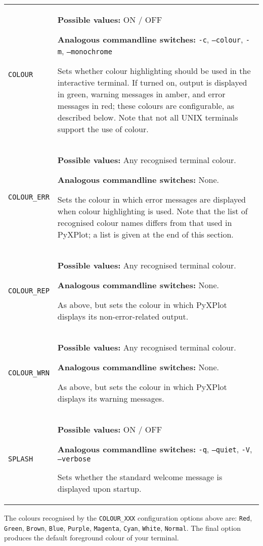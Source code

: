 \documentclass[a4paper,onecolumn,11pt]{book}
\begin{document}
\begin{longtable}{p{3.4cm}p{9cm}}
\texttt{COLOUR} & \textbf{Possible values:} ON / OFF

                  \textbf{Analogous commandline switches:} \texttt{-c}, \texttt{--colour}, \texttt{-m}, \texttt{--monochrome}

                  Sets whether colour highlighting should be used in the interactive terminal. If turned on, output is displayed in green, warning messages in amber, and error messages in red; these colours are configurable, as described below. Note that not all UNIX terminals support the use of colour.
                   \\
\texttt{COLOUR\_ERR} & \textbf{Possible values:} Any recognised terminal colour.

                  \textbf{Analogous commandline switches:} None.

                  Sets the colour in which error messages are displayed when colour highlighting is used. Note that the list of recognised colour names differs from that used in PyXPlot; a list is given at the end of this section.
                   \\
\texttt{COLOUR\_REP} & \textbf{Possible values:} Any recognised terminal colour.

                  \textbf{Analogous commandline switches:} None.

                  As above, but sets the colour in which PyXPlot displays its non-error-related output.
                   \\
\texttt{COLOUR\_WRN} & \textbf{Possible values:} Any recognised terminal colour.

                  \textbf{Analogous commandline switches:} None.

                  As above, but sets the colour in which PyXPlot displays its warning messages.
                   \\
\texttt{SPLASH} & \textbf{Possible values:} ON / OFF

                  \textbf{Analogous commandline switches:} \texttt{-q}, \texttt{--quiet}, \texttt{-V}, \texttt{--verbose}

                  Sets whether the standard welcome message is displayed upon startup.
                   \\
\end{longtable}

The colours recognised by the \texttt{COLOUR\_XXX} configuration options above are: \texttt{Red}, \texttt{Green}, \texttt{Brown}, \texttt{Blue}, \texttt{Purple}, \texttt{Magenta}, \texttt{Cyan}, \texttt{White}, \texttt{Normal}. The final option produces the default foreground colour of your terminal.
\end{document}
